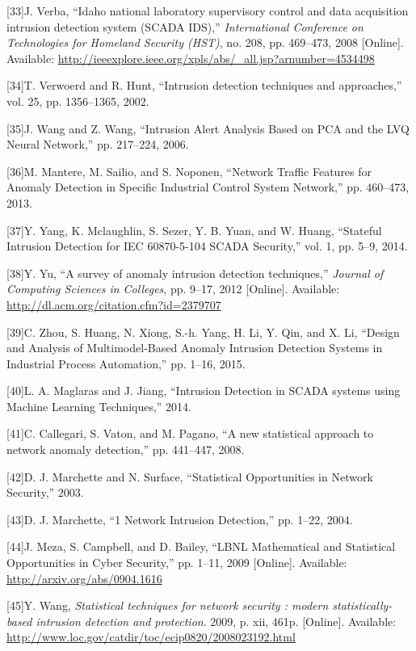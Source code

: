 \documentclass[11pt,a4paper]{article}
\begin{document}
{[}33{]}J. Verba, ``Idaho national laboratory supervisory control and
data acquisition intrusion detection system (SCADA IDS),''
\emph{International Conference on Technologies for Homeland Security
(HST)}, no. 208, pp. 469--473, 2008 {[}Online{]}. Available:
\url{http://ieeexplore.ieee.org/xpls/abs/_all.jsp?arnumber=4534498}

{[}34{]}T. Verwoerd and R. Hunt, ``Intrusion detection techniques and
approaches,'' vol. 25, pp. 1356--1365, 2002.

{[}35{]}J. Wang and Z. Wang, ``Intrusion Alert Analysis Based on PCA and
the LVQ Neural Network,'' pp. 217--224, 2006.

{[}36{]}M. Mantere, M. Sailio, and S. Noponen, ``Network Traffic
Features for Anomaly Detection in Specific Industrial Control System
Network,'' pp. 460--473, 2013.

{[}37{]}Y. Yang, K. Mclaughlin, S. Sezer, Y. B. Yuan, and W. Huang,
``Stateful Intrusion Detection for IEC 60870-5-104 SCADA Security,''
vol. 1, pp. 5--9, 2014.

{[}38{]}Y. Yu, ``A survey of anomaly intrusion detection techniques,''
\emph{Journal of Computing Sciences in Colleges}, pp. 9--17, 2012
{[}Online{]}. Available: \url{http://dl.acm.org/citation.cfm?id=2379707}

{[}39{]}C. Zhou, S. Huang, N. Xiong, S.-h. Yang, H. Li, Y. Qin, and X.
Li, ``Design and Analysis of Multimodel-Based Anomaly Intrusion
Detection Systems in Industrial Process Automation,'' pp. 1--16, 2015.

{[}40{]}L. A. Maglaras and J. Jiang, ``Intrusion Detection in SCADA
systems using Machine Learning Techniques,'' 2014.

{[}41{]}C. Callegari, S. Vaton, and M. Pagano, ``A new statistical
approach to network anomaly detection,'' pp. 441--447, 2008.

{[}42{]}D. J. Marchette and N. Surface, ``Statistical Opportunities in
Network Security,'' 2003.

{[}43{]}D. J. Marchette, ``1 Network Intrusion Detection,'' pp. 1--22,
2004.

{[}44{]}J. Meza, S. Campbell, and D. Bailey, ``LBNL Mathematical and
Statistical Opportunities in Cyber Security,'' pp. 1--11, 2009
{[}Online{]}. Available: \url{http://arxiv.org/abs/0904.1616}

{[}45{]}Y. Wang, \emph{Statistical techniques for network security :
modern statistically-based intrusion detection and protection}. 2009, p.
xii, 461p. {[}Online{]}. Available:
\url{http://www.loc.gov/catdir/toc/ecip0820/2008023192.html}
\end{document}
